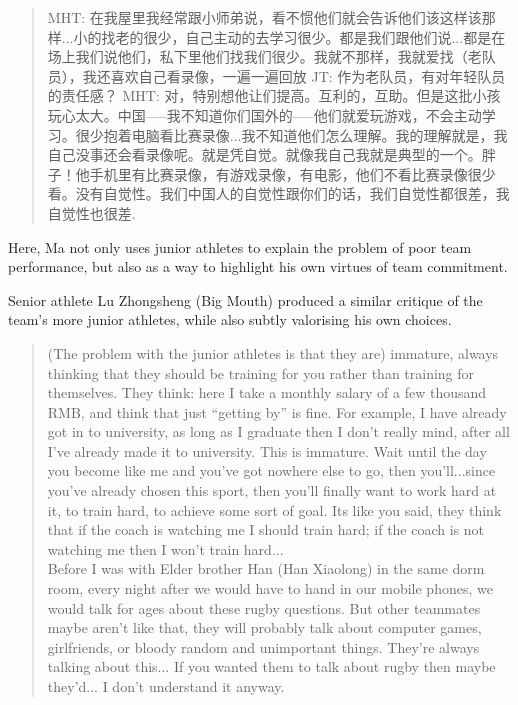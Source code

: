 \begin{CJK}{UTF8}{gbsn}
  \begin{quote}
    MHT: 在我屋里我经常跟小师弟说，看不惯他们就会告诉他们该这样该那样...小的找老的很少，自己主动的去学习很少。都是我们跟他们说...都是在场上我们说他们，私下里他们找我们很少。我就不那样，我就爱找（老队员），我还喜欢自己看录像，一遍一遍回放
    JT: 作为老队员，有对年轻队员的责任感？
    MHT: 对，特别想他让们提高。互利的，互助。但是这批小孩玩心太大。中国—--我不知道你们国外的—--他们就爱玩游戏，不会主动学习。很少抱着电脑看比赛录像...我不知道他们怎么理解。我的理解就是，我自己没事还会看录像呢。就是凭自觉。就像我自己我就是典型的一个。胖子！他手机里有比赛录像，有游戏录像，有电影，他们不看比赛录像很少看。没有自觉性。我们中国人的自觉性跟你们的话，我们自觉性都很差，我自觉性也很差.
  \end{quote}

Here, Ma not only uses junior athletes to explain the problem of poor team performance, but also as a way to highlight his own virtues of team commitment.

Senior athlete Lu Zhongsheng (Big Mouth) produced a similar critique of the team's more junior athletes, while also subtly valorising his own choices.

  \begin{quote}
    (The problem with the junior athletes is that they are) immature, always thinking that they should be training for you rather than training for themselves.  They think: here I take a monthly salary of a few thousand RMB, and think that just ``getting by'' is fine.  For example, I have already got in to university, as long as I graduate then I don't really mind, after all I've already made it to university.  This is immature.  Wait until the day you become like me and you've got nowhere else to go, then you'll...since you've already chosen this sport, then you'll finally want to work hard at it, to train hard, to achieve some sort of goal.  Its like you said, they think that if the coach is watching me I should train hard; if the coach is not watching me then I won't train hard...\\

    Before I was with Elder brother Han (Han Xiaolong) in the same dorm room, every night after we would have to hand in our mobile phones, we would talk for ages about these rugby questions. But other teammates maybe aren't like that, they will probably talk about computer games, girlfriends, or bloody random and unimportant things.  They're always talking about this... If you wanted them to talk about rugby then maybe they'd... I don't understand it anyway.
  \end{quote}


\end{CJK}

